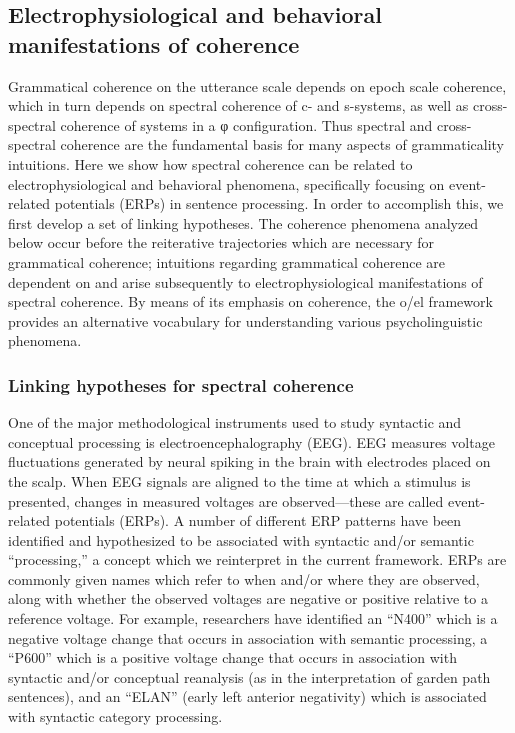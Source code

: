 \subsection{Electrophysiological and behavioral manifestations of coherence}

Grammatical coherence on the utterance scale depends on epoch scale coherence, which in turn depends on spectral coherence of c- and s-systems, as well as cross-spectral coherence of systems in a φ configuration. Thus spectral and cross-spectral coherence are the fundamental basis for many aspects of grammaticality intuitions. Here we show how spectral coherence can be related to electrophysiological and behavioral phenomena, specifically focusing on event-related potentials (ERPs) in sentence processing. In order to accomplish this, we first develop a set of linking hypotheses. The coherence phenomena analyzed below occur before the reiterative trajectories which are necessary for grammatical coherence; intuitions regarding grammatical coherence are dependent on and arise subsequently to electrophysiological manifestations of spectral coherence. By means of its emphasis on coherence, the o/el framework provides an alternative vocabulary for understanding various psycholinguistic phenomena.

\subsubsection{Linking hypotheses for spectral coherence}

One of the major methodological instruments used to study syntactic and conceptual processing is electroencephalography (EEG). EEG measures voltage fluctuations generated by neural spiking in the brain with electrodes placed on the scalp. When EEG signals are aligned to the time at which a stimulus is presented, changes in measured voltages are observed—these are called event-related potentials (ERPs). A number of different ERP patterns have been identified and hypothesized to be associated with syntactic and/or semantic “processing,” a concept which we reinterpret in the current framework. ERPs are commonly given names which refer to when and/or where they are observed, along with whether the observed voltages are negative or positive relative to a reference voltage. For example, researchers have identified an “N400” which is a negative voltage change that occurs in association with semantic processing, a “P600” which is a positive voltage change that occurs in association with syntactic and/or conceptual reanalysis (as in the interpretation of garden path sentences), and an “ELAN” (early left anterior negativity) which is associated with syntactic category processing. 

